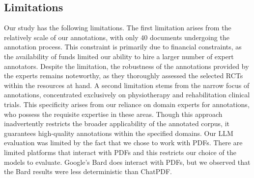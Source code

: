\documentclass[sn-mathphys,Numbered]{sn-jnl}%
\theoremstyle{thmstyleone}%
\theoremstyle{thmstyletwo}%
\theoremstyle{thmstylethree}%
\begin{document}

%
%
%
\subsection{Limitations}
\label{subsec:limits}
%
Our study has the following limitations.
The first limitation arises from the relatively scale of our annotations, with only 40 documents undergoing the annotation process.
This constraint is primarily due to financial constraints, as the availability of funds limited our ability to hire a larger number of expert annotators.
Despite the limitation, the robustness of the annotations provided by the experts remains noteworthy, as they thoroughly assessed the selected RCTs within the resources at hand.
A second limitation stems from the narrow focus of annotations, concentrated exclusively on physiotherapy and rehabilitation clinical trials.
This specificity arises from our reliance on domain experts for annotations, who possess the requisite expertise in these areas.
Though this approach inadvertently restricts the broader applicability of the annotated corpus, it guarantees high-quality annotations within the specified domains.
Our LLM evaluation was limited by the fact that we chose to work with PDFs. 
There are limited platforms that interact with PDFs and this restricts our choice of the models to evaluate.
Google's Bard does interact with PDFs, but we observed that the Bard results were less deterministic than ChatPDF.
%
%
%
\end{document}
